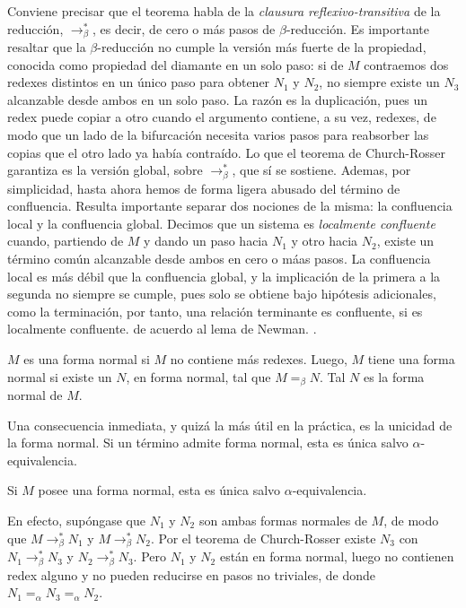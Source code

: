 Conviene precisar que el teorema habla de la \textit{clausura reflexivo-transitiva} de la reducción, $\to_\beta^{\ast}$, es decir, de cero o más pasos de $\beta$-reducción. Es importante resaltar que la $\beta$-reducción no cumple la versión más fuerte de la propiedad, conocida como propiedad del diamante en un solo paso: si de $M$ contraemos dos redexes distintos en un único paso para obtener $N_1$ y $N_2$, no siempre existe un $N_3$ alcanzable desde ambos en un solo paso. La razón es la duplicación, pues un redex puede copiar a otro cuando el argumento contiene, a su vez, redexes, de modo que un lado de la bifurcación necesita varios pasos para reabsorber las copias que el otro lado ya había contraído. Lo que el teorema de Church-Rosser garantiza es la versión global, sobre $\to_\beta^{\ast}$, que sí se sostiene.
\newline
\newline
Ademas, por simplicidad, hasta ahora hemos de forma ligera abusado del término de confluencia. Resulta importante separar dos nociones de la misma: la confluencia local y la confluencia global. Decimos que un sistema es \textit{localmente confluente} cuando, partiendo de $M$ y dando un paso hacia $N_1$ y otro hacia $N_2$, existe un término común alcanzable desde ambos en cero o máas pasos. La confluencia local es más débil que la confluencia global, y la implicación de la primera a la segunda no siempre se cumple, pues solo se obtiene bajo hipótesis adicionales, como la terminación, por tanto, una relación terminante es confluente, si es localmente confluente. de acuerdo al lema de Newman. \citep{traat, barendregt1984}. 
\newline
\begin{lemma}
    $M$ es una forma normal si $M$ no contiene más redexes. Luego, $M$ tiene una forma normal si existe un $N$, en forma normal, tal que $M =_\beta N$. Tal $N$ es la forma normal de $M$.
\end{lemma}

Una consecuencia inmediata, y quizá la más útil en la práctica, es la unicidad de la forma normal. Si un término admite forma normal, esta es única salvo $\alpha$-equivalencia.

\begin{corollary}
  Si $M$ posee una forma normal, esta es única salvo $\alpha$-equivalencia.\end{corollary}

En efecto, supóngase que $N_1$ y $N_2$ son ambas formas normales de $M$, de modo que $M\to_\beta^{\ast}N_1$ y $M\to_\beta^{\ast}N_2$. Por el teorema de Church-Rosser existe $N_3$ con $N_1\to_\beta^{\ast}N_3$ y $N_2\to_\beta^{\ast}N_3$. Pero $N_1$ y $N_2$ están en forma normal, luego no contienen redex alguno y no pueden reducirse en pasos no triviales, de donde $N_1 =_\alpha N_3 =_\alpha N_2$.


